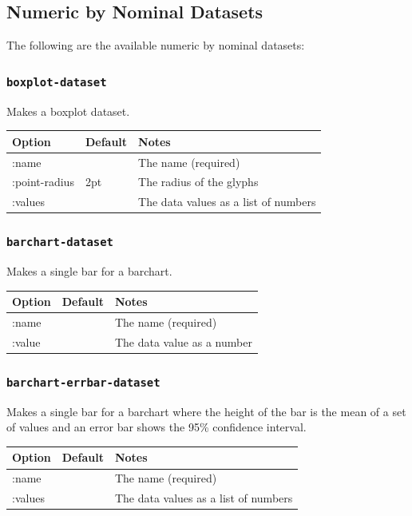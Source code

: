 \documentclass{article}
\begin{document}
\subsection{Numeric by Nominal Datasets}

The following are the available numeric by nominal datasets:

\subsubsection{\tt boxplot-dataset}

Makes a boxplot dataset.

\begin{center}
\begin{tabular}{lll}
Option & Default & Notes \\
\hline
:name & & The name (required)\\
:point-radius & 2pt & The radius of the glyphs\\
:values & & The data values as a list of numbers\\
\end{tabular}
\end{center}

\subsubsection{\tt barchart-dataset}

Makes a single bar for a barchart.

\begin{center}
\begin{tabular}{lll}
Option & Default & Notes \\
\hline
:name & & The name (required)\\
:value & & The data value as a number\\
\end{tabular}
\end{center}

\subsubsection{\tt barchart-errbar-dataset}

Makes a single bar for a barchart where the height of the bar is the
mean of a set of values and an error bar shows the 95\% confidence
interval.

\begin{center}
\begin{tabular}{lll}
Option & Default & Notes \\
\hline
:name & & The name (required)\\
:values & & The data values as a list of numbers\\
\end{tabular}
\end{center}
\end{document}
